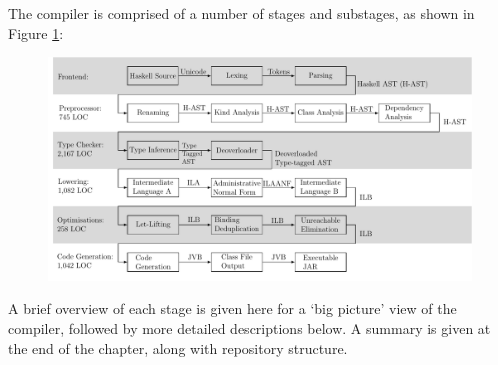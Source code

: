 \documentclass[dissertation.tex]{subfiles}
\begin{document}
The compiler is comprised of a number of stages and substages, as shown in Figure \ref{fig:compiler-layout}:

\begin{figure}[h]
    \includegraphics[width=\textwidth]{figures/compiler_layout.pdf}
    \caption{}
    \label{fig:compiler-layout}
\end{figure}

A brief overview of each stage is given here for a `big picture' view of the compiler, followed by more detailed
descriptions below. A summary is given at the end of the chapter, along with repository structure.
\end{document}
